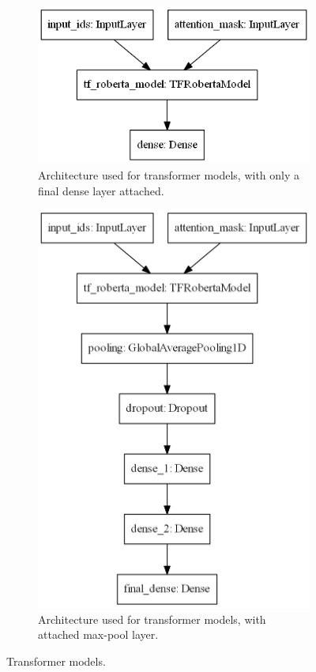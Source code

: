 \documentclass[acmsmall,nonacm]{acmart}
\begin{document}
\begin{figure}[H]
  \begin{subfigure}[b]{0.35\textwidth}
    \includegraphics[width=\textwidth]{assets/roberta_model.png}
    \caption{Architecture used for transformer models, with only a final dense layer attached.}
    \label{fig:roberta_model}
  \end{subfigure}
  \hfill
  \begin{subfigure}[b]{0.35\textwidth}
    \includegraphics[width=\textwidth]{assets/roberta_model_maxpool.png}
    \caption{Architecture used for transformer models, with attached max-pool layer.}
    \label{fig:roberta_maxpool_model}
  \end{subfigure}
  \caption{Transformer models.}
  \label{fig:transformer_models}
\end{figure}
\end{document}
